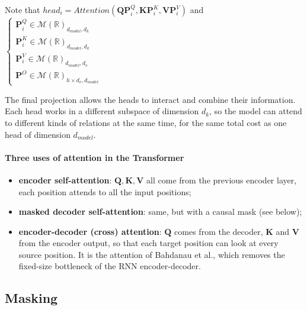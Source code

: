 \begin{center}
\end{center}

Note that $head_{i} = Attention\left(\bm{Q}\bm{P}_{i}^{Q},\bm{K}\bm{P}_{i}^{K},\bm{V}\bm{P}_{i}^{V}\right)$ and
$
\begin{cases}
\bm{P}_{i}^{Q}\in\mathcal{M}(\mathbb{R})_{d_{model},d_{k}}\\
\bm{P}_{i}^{K}\in\mathcal{M}(\mathbb{R})_{d_{model},d_{k}}\\ 
\bm{P}_{i}^{V}\in\mathcal{M}(\mathbb{R})_{d_{model},d_{v}}\\
\bm{P}^{O}\in\mathcal{M}(\mathbb{R})_{h\times d_{v},d_{model}}
\end{cases}
$

The final projection allows the heads to interact and combine their information.\\
Each head works in a different subspace of dimension $d_{k}$, so the model can attend to
different kinds of relations at the same time, for the same total cost as one head of
dimension $d_{model}$.

\paragraph{Three uses of attention in the Transformer}
\begin{itemize}
    \item \textbf{encoder self-attention}: $\bm{Q},\bm{K},\bm{V}$ all come from the previous
        encoder layer, each position attends to all the input positions;
    \item \textbf{masked decoder self-attention}: same, but with a causal mask (see below);
    \item \textbf{encoder-decoder (cross) attention}: $\bm{Q}$ comes from the decoder,
        $\bm{K}$ and $\bm{V}$ from the encoder output, so that each target position can look
        at every source position. It is the attention of Bahdanau et al., which removes the
        fixed-size bottleneck of the RNN encoder-decoder.
\end{itemize}

\subsection{Masking}
